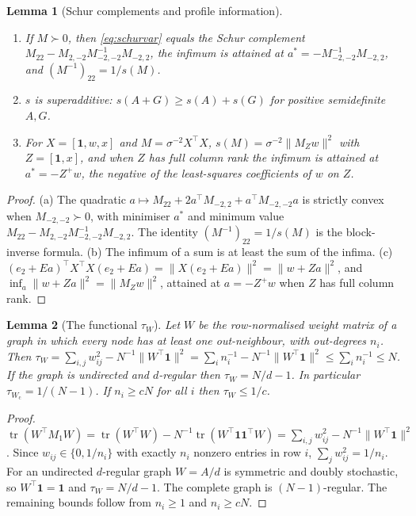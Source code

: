 \documentclass[12pt]{article}
\theoremstyle{plain}
\newtheorem{lemma}{Lemma}
\theoremstyle{definition}
\theoremstyle{remark}
\newcommand{\tr}{\operatorname{tr}}
\newcommand{\one}{\mathbf{1}}
\newcommand{\Wc}{W_{\mathrm{c}}}
\newcommand{\tauW}{\tau_W}
\newcommand{\T}{^{\top}}
\begin{document}
\begin{lemma}[Schur complements and profile information]\label{lem:schur}
\begin{enumerate}[label=(\alph*),leftmargin=*]
\item If $M\succ0$, then \eqref{eq:schurvar} equals the Schur complement $M_{22}-M_{2,-2}M_{-2,-2}^{-1}M_{-2,2}$, the infimum is attained at $a^*=-M_{-2,-2}^{-1}M_{-2,2}$, and $(M^{-1})_{22}=1/s(M)$.
\item $s$ is superadditive: $s(A+G)\ge s(A)+s(G)$ for positive semidefinite $A,G$.
\item For $X=[\one,w,x]$ and $M=\sigma^{-2}X\T X$, $s(M)=\sigma^{-2}\|M_Zw\|^2$ with $Z=[\one,x]$, and when $Z$ has full column rank the infimum is attained at $a^*=-Z^+w$, the negative of the least-squares coefficients of $w$ on $Z$.
\end{enumerate}
\end{lemma}
\begin{proof}
(a) The quadratic $a\mapsto M_{22}+2a\T M_{-2,2}+a\T M_{-2,-2}a$ is strictly convex when $M_{-2,-2}\succ0$, with minimiser $a^*$ and minimum value $M_{22}-M_{2,-2}M_{-2,-2}^{-1}M_{-2,2}$. The identity $(M^{-1})_{22}=1/s(M)$ is the block-inverse formula. (b) The infimum of a sum is at least the sum of the infima. (c) $(e_2+Ea)\T X\T X(e_2+Ea)=\|X(e_2+Ea)\|^2=\|w+Za\|^2$, and $\inf_a\|w+Za\|^2=\|M_Zw\|^2$, attained at $a=-Z^+w$ when $Z$ has full column rank.
\end{proof}

\begin{lemma}[The functional $\tauW$]\label{lem:tau}
Let $W$ be the row-normalised weight matrix of a graph in which every node has at least one out-neighbour, with out-degrees $n_i$. Then $\tauW=\sum_{i,j}w_{ij}^2-N^{-1}\|W\T\one\|^2=\sum_in_i^{-1}-N^{-1}\|W\T\one\|^2\le\sum_in_i^{-1}\le N$. If the graph is undirected and $d$-regular then $\tauW=N/d-1$. In particular $\tau_{\Wc}=1/(N-1)$. If $n_i\ge cN$ for all $i$ then $\tauW\le1/c$.
\end{lemma}
\begin{proof}
$\tr(W\T M_1W)=\tr(W\T W)-N^{-1}\tr(W\T\one\one\T W)=\sum_{i,j}w_{ij}^2-N^{-1}\|W\T\one\|^2$. Since $w_{ij}\in\{0,1/n_i\}$ with exactly $n_i$ nonzero entries in row $i$, $\sum_jw_{ij}^2=1/n_i$. For an undirected $d$-regular graph $W=A/d$ is symmetric and doubly stochastic, so $W\T\one=\one$ and $\tauW=N/d-1$. The complete graph is $(N-1)$-regular. The remaining bounds follow from $n_i\ge1$ and $n_i\ge cN$.
\end{proof}
\end{document}
